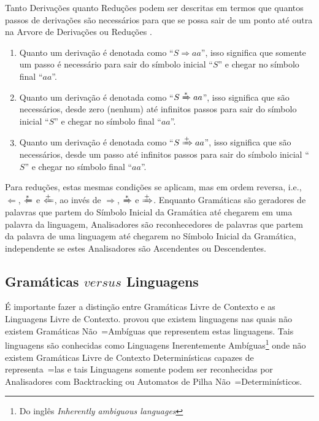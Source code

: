{    Tanto Derivações quanto Reduções podem ser descritas em termos que quantos passos de derivações são necessários para que se possa sair de um ponto até outra na Arvore de Derivações ou
    Reduções \cite{ahoCompilerDragonBook}.
    \begin{enumerate}%
        \item Quanto um derivação é denotada como ``$S \Rightarrow a a $'',
        isso significa que somente um passo é necessário para sair do símbolo inicial ``$S$'' e
        chegar no símbolo final ``$a a$''.
        \item Quanto um derivação é denotada como ``$S \xRightarrow{*} a a $'',
        isso significa que são necessários,
        desde zero (nenhum) até infinitos passos para sair do símbolo inicial ``$S$'' e
        chegar no símbolo final ``$a a$''.
        \item Quanto um derivação é denotada como ``$S \xRightarrow{+} a a $'',
        isso significa que são necessários,
        desde um passo até infinitos passos para sair do símbolo inicial ``$S$'' e
        chegar no símbolo final ``$a a$''.
    \end{enumerate}

    Para reduções,
    estas mesmas condições se aplicam,
    mas em ordem reversa,
    i.e., $\Leftarrow$, $\xLeftarrow{*}$ e $\xLeftarrow{+}$,
    ao invés de $\Rightarrow$,
    $\xRightarrow{*}$ e
    $\xRightarrow{+}$.
    Enquanto Gramáticas são geradores de palavras que partem do Símbolo Inicial da Gramática até chegarem em uma palavra da linguagem,
    Analisadores são reconhecedores de palavras que partem da palavra de uma linguagem até chegarem no Símbolo Inicial da Gramática,
    independente se estes Analisadores são Ascendentes ou
    Descendentes.


\subsection{Gramáticas $versus$ Linguagens}

    É importante fazer a distinção entre Gramáticas Livre de Contexto e
    as Linguagens Livre de Contexto.
     provou que existem linguagens nas quais não existem Gramáticas Não~=Ambíguas que representem estas linguagens.
    Tais linguagens são conhecidas como Linguagens Inerentemente Ambíguas\footnote{Do inglês \textit{Inherently ambiguous languages}} onde não existem Gramáticas Livre de Contexto Determinísticas capazes de representa~=las e
    tais Linguagens somente podem ser reconhecidas por Analisadores com Backtracking \cite{ahoCompilerDragonBook} ou
    Automatos de Pilha Não~=Determinísticos.

}
